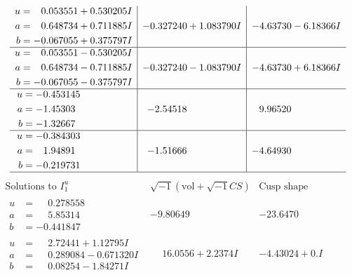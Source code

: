 \documentclass[1p]{elsarticle_modified}
\theoremstyle{definition}
\newcommand{\I}{\sqrt{-1}}
\begin{document}
$$\begin{array}{c|c|c}
\begin{aligned}
u &= \phantom{-}0.053551 + 0.530205 I \\
a &= \phantom{-}0.648734 + 0.711885 I \\
b &= -0.067055 + 0.375797 I\end{aligned}
 & -0.327240 + 1.083790 I & -4.63730 - 6.18366 I \\ \hline\begin{aligned}
u &= \phantom{-}0.053551 - 0.530205 I \\
a &= \phantom{-}0.648734 - 0.711885 I \\
b &= -0.067055 - 0.375797 I\end{aligned}
 & -0.327240 - 1.083790 I & -4.63730 + 6.18366 I \\ \hline\begin{aligned}
u &= -0.453145\phantom{ +0.000000I} \\
a &= -1.45303\phantom{ +0.000000I} \\
b &= -1.32667\phantom{ +0.000000I}\end{aligned}
 & -2.54518\phantom{ +0.000000I} & \phantom{-}9.96520\phantom{ +0.000000I} \\ \hline\begin{aligned}
u &= -0.384303\phantom{ +0.000000I} \\
a &= \phantom{-}1.94891\phantom{ +0.000000I} \\
b &= -0.219731\phantom{ +0.000000I}\end{aligned}
 & -1.51666\phantom{ +0.000000I} & -4.64930\phantom{ +0.000000I}\\
 \hline 
 \end{array}$$\newpage$$\begin{array}{c|c|c}  
\text{Solutions to }I^u_{1}& \I (\text{vol} + \sqrt{-1}CS) & \text{Cusp shape}\\
 \hline 
\begin{aligned}
u &= \phantom{-}0.278558\phantom{ +0.000000I} \\
a &= \phantom{-}5.85314\phantom{ +0.000000I} \\
b &= -0.441847\phantom{ +0.000000I}\end{aligned}
 & -9.80649\phantom{ +0.000000I} & -23.6470\phantom{ +0.000000I} \\ \hline\begin{aligned}
u &= \phantom{-}2.72441 + 1.12795 I \\
a &= \phantom{-}0.289084 - 0.671320 I \\
b &= \phantom{-}0.08254 - 1.84271 I\end{aligned}
 & \phantom{-}16.0556 + 2.2374 I & -4.43024 + 0. I\phantom{ +0.000000I} \\ \hline\begin{aligned}

\end{aligned}
\end{array}$$
\end{document}
